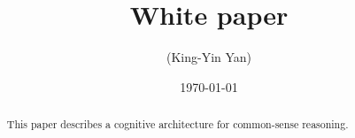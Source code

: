 \documentclass[orivec]{llncs}
\title{White paper}
\author{\usebox{\MyName} (King-Yin Yan)
}
\institute{General.Intelligence@Gmail.com}
\date{\today}
\begin{document}
\let\labelitemi\labelitemii

\maketitle

\noindent
\makebox[\linewidth]{\small \today}

\setlength{\parindent}{0em}
\setlength{\parskip}{2.8ex plus0.8ex minus0.8ex}

\begin{abstract}
	This paper describes a cognitive architecture for common-sense reasoning.
\end{abstract}

\end{document}
